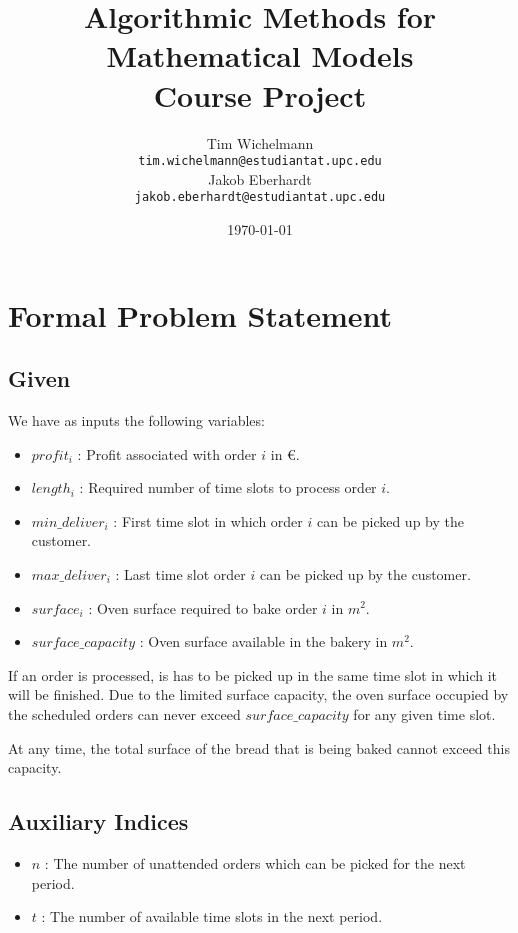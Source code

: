 \documentclass{article}
\title{Algorithmic Methods for Mathematical Models\\
  Course Project }
\author{Tim Wichelmann\\ \texttt{tim.wichelmann@estudiantat.upc.edu}\\[1ex] %
  Jakob Eberhardt\\ \texttt{jakob.eberhardt@estudiantat.upc.edu}}
\date{\today}
\begin{document}
\maketitle
\thispagestyle{empty}
\newpage
\setcounter{page}{1}
\tableofcontents
\listoffigures
\newpage

\section{Formal Problem Statement}
\subsection*{Given}

We have as inputs the following variables:
\begin{itemize}
    \item $profit_i$ : Profit associated with order $i$ in \euro{}.
    \item $length_i$ : Required number of time slots to process order $i$.
    \item $min\_deliver_i$ : First time slot in which order $i$ can be picked up by the customer.
    \item $max\_deliver_i$ : Last time slot order $i$ can be picked up by the customer.
    \item $surface_i$ : Oven surface required to bake order $i$ in $m^2$.
    \item $surface\_capacity$ : Oven surface available in the bakery in $m^2$.
\end{itemize}
If an order is processed, is has to be picked up in the same time slot in which it will be finished.
Due to the limited surface capacity, the  oven surface occupied by the scheduled orders can never exceed $surface\_capacity$ for any given time slot.

At any time, the total surface of the bread that is being baked cannot exceed this capacity.
\subsection*{Auxiliary Indices} %
\begin{itemize}
    \item $n$ : The number of unattended orders which can be picked for the next period.
    \item $t$ : The number of available time slots in the next period.
\end{itemize}
\end{document}
